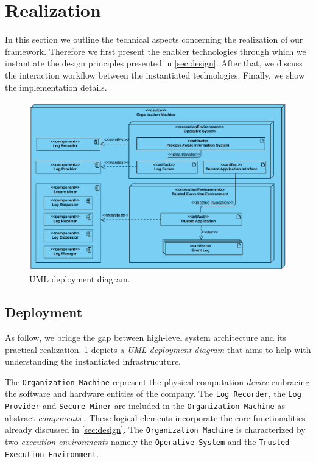 \section{Realization}
In this section we outline the technical aspects concerning the realization of our framework. Therefore we first present the enabler technologies through which we instantiate the design principles presented in \cref{sec:design}. After that, we discuss the interaction workflow between the instantiated technologies. Finally, we show the implementation details.
\begin{figure}[t]
\centering
\includegraphics[width=10 cm]{content/figures/deployment_diagram.pdf}
\caption{UML deployment diagram.}
\label{fig:deployment_diagram}
\end{figure}
\subsection{Deployment}
As follow, we bridge the gap between high-level system architecture and its practical realization. \cref{fig:deployment_diagram} depicts a \textit{UML deployment diagram} \cite{koch2002expressive} that aims to help with understanding the instantiated infrastrucuture. 

The \texttt{Organization Machine} represent the physical computation \textit{device} embracing the software and hardware entities of the company. The \texttt{Log Recorder}, the \texttt{Log Provider} and \texttt{Secure Miner} are included in the \texttt{Organization Machine} as abstract \textit{components} . These logical elements incorporate the core functionalities already discussed in \cref{sec:design}. The \texttt{Organization Machine} is characterized by two \textit{execution environment}s namely the \texttt{Operative System} and the \texttt{Trusted Execution Environment}.


